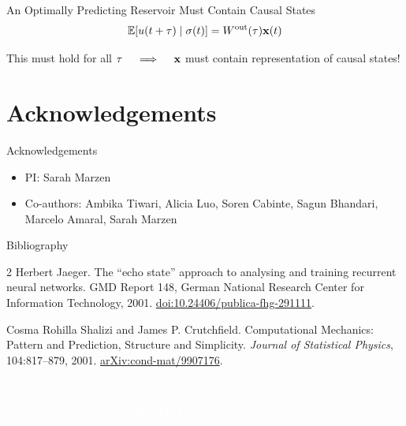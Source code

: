 \documentclass[10pt, aspectratio=169]{beamer}
\begin{document}
\begin{frame}{An Optimally Predicting Reservoir Must Contain Causal States}
	\begin{equation}
		\mathbb{E}[u(t+\tau) \mid \sigma(t)] = W^\text{out}(\tau)\vb{x}(t)
	\end{equation}
	\vspace{0.5cm}
	\begin{center}
		This must hold for all $\tau\quad\implies\quad \vb{x}$ must contain representation of causal states!  
	\end{center}
\end{frame}

\section{Acknowledgements}

\begin{frame}{Acknowledgements}
	\begin{itemize}\addtolength{\itemsep}{10pt}
		\item PI: Sarah Marzen
		\item Co-authors: Ambika Tiwari, Alicia Luo, Soren Cabinte, Sagun Bhandari, Marcelo Amaral, Sarah Marzen
	\end{itemize}
\end{frame}

\begin{frame}{Bibliography}
	\begin{thebibliography}{2}
		Herbert Jaeger.
		\newblock The ``echo state'' approach to analysing and training recurrent neural networks.
		\newblock GMD Report 148, German National Research Center for Information Technology, 2001.
		\newblock \href{https://doi.org/10.24406/publica-fhg-291111}{doi:10.24406/publica-fhg-291111}.

		\vspace{1em}
		Cosma Rohilla Shalizi and James P. Crutchfield.
		\newblock Computational Mechanics: Pattern and Prediction, Structure and Simplicity.
		\newblock \emph{Journal of Statistical Physics}, 104:817--879, 2001.
		\newblock \href{https://arxiv.org/abs/cond-mat/9907176}{arXiv:cond-mat/9907176}.
	\end{thebibliography}
\end{frame}

{\BackgroundShaded
\begin{frame}
\begin{center}
	\Large{\textcolor{white}{Thank you!}}
\end{center}
\vspace{1cm}
{\footnotesize \textcolor{white}{Sponsored by ARO Grant W9111NF-25-1-0260.}}
\end{frame}}
\end{document}
